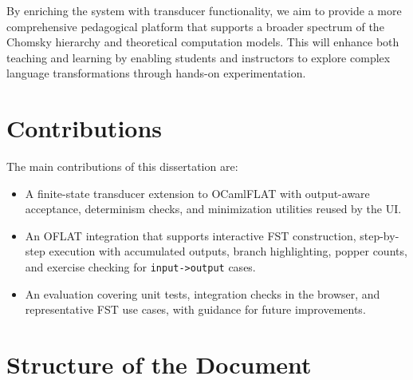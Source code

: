 By enriching the system with transducer functionality, we aim to provide a more comprehensive pedagogical platform that supports a broader 
spectrum of the Chomsky hierarchy and theoretical computation models. This will enhance both teaching and learning by enabling students 
and instructors to explore complex language transformations through hands-on experimentation.

\section{Contributions}
\label{sec:intro_contrib}

The main contributions of this dissertation are:
\begin{itemize}
  \item A finite-state transducer extension to OCamlFLAT with output-aware acceptance, determinism checks, and minimization utilities reused by the UI.
  \item An OFLAT integration that supports interactive FST construction, step-by-step execution with accumulated outputs, branch highlighting, 
  popper counts, and exercise checking for \texttt{input->output} cases.
  \item An evaluation covering unit tests, integration checks in the browser, and representative FST use cases, with guidance for future improvements.
\end{itemize}

\section{Structure of the Document}

